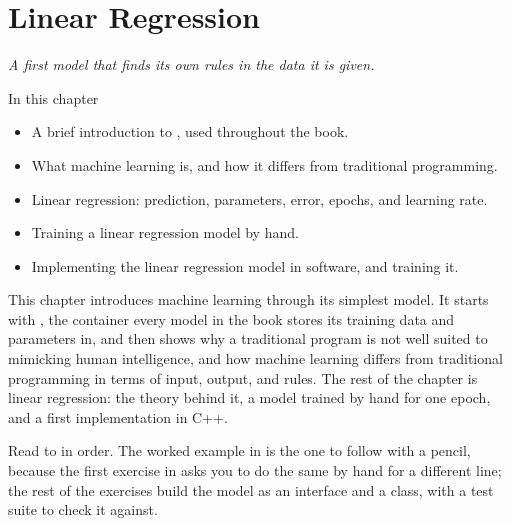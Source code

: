 
\chapter{Linear Regression}
\label{c1:ch:linreg}

{\large\itshape A first model that finds its own rules in the data it is given.\par}

\begin{chapterbox}{In this chapter}
\begin{itemize}
  \item A brief introduction to , used throughout the book.
  \item What machine learning is, and how it differs from traditional programming.
  \item Linear regression: prediction, parameters, error, epochs, and learning rate.
  \item Training a linear regression model by hand.
  \item Implementing the linear regression model in software, and training it.
\end{itemize}
\end{chapterbox}

This chapter introduces machine learning through its simplest model. It starts with
, the container every model in the book stores its training data and parameters
in, and then shows why a traditional program is not well suited to mimicking human intelligence,
and how machine learning differs from traditional programming in terms of input, output, and rules.
The rest of the chapter is linear regression: the theory behind it, a model trained by hand for one
epoch, and a first implementation in C++.

Read  to  in order. The worked example in
 is the one to follow with a pencil, because the first exercise in
 asks you to do the same by hand for a different line; the rest of the
exercises build the model as an interface and a class, with a test suite to check it against.




